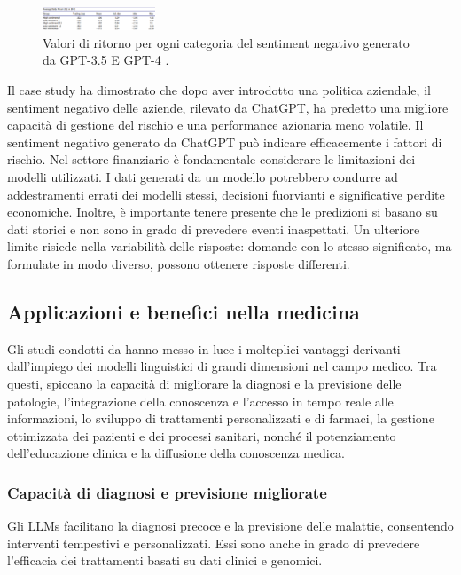 \begin{figure}[ht]
	\centering
	\includegraphics[width=0.3\textwidth]{Immagini/sentiment_analysis.png}
	\caption{ Valori di ritorno per ogni categoria del sentiment negativo generato da GPT-3.5 E GPT-4 \cite{chen2023fiction}.}
	\label{fig:sentiment-analysis}
\end{figure}
Il case study ha dimostrato che dopo aver introdotto una politica aziendale, il sentiment negativo delle aziende, rilevato da ChatGPT, ha predetto una migliore capacità di gestione del rischio e una performance azionaria meno volatile.
Il sentiment negativo generato da ChatGPT può indicare efficacemente i fattori di rischio.
Nel settore finanziario è fondamentale considerare le limitazioni dei modelli utilizzati. I dati generati da un modello potrebbero condurre ad addestramenti errati dei modelli stessi, decisioni fuorvianti e significative perdite economiche. Inoltre, è importante tenere presente che le predizioni si basano su dati storici e non sono in grado di prevedere eventi inaspettati. Un ulteriore limite risiede nella variabilità delle risposte: domande con lo stesso significato, ma formulate in modo diverso, possono ottenere risposte differenti.

\subsection{Applicazioni e benefici nella medicina}
Gli studi condotti da \cite{zheng2024large} hanno messo in luce i molteplici vantaggi derivanti dall'impiego dei modelli linguistici di grandi dimensioni nel campo medico. Tra questi, spiccano la capacità di migliorare la diagnosi e la previsione delle patologie, l'integrazione della conoscenza e l'accesso in tempo reale alle informazioni, lo sviluppo di trattamenti personalizzati e di farmaci, la gestione ottimizzata dei pazienti e dei processi sanitari, nonché il potenziamento dell'educazione clinica e la diffusione della conoscenza medica.

\subsubsection{Capacità di diagnosi e previsione migliorate}
Gli LLMs facilitano la diagnosi precoce e la previsione delle malattie, consentendo interventi tempestivi e personalizzati. Essi sono anche in grado di prevedere l'efficacia dei trattamenti basati su dati clinici e genomici.

